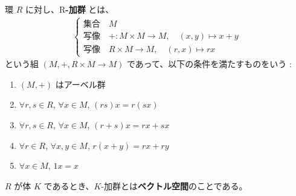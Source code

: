 \documentclass[article,paper=a4paper]{jlreq}
\begin{document}
\begin{dfn}
  環 $R$ に対し、R\textbf{-加群} とは、
  \begin{align*}
    \begin{cases}
      \text{集合} \quad M \\
      \text{写像} \quad + \colon M \times M \to M, \quad (x, y) \mapsto x + y \\
      \text{写像} \quad R \times M \to M, \quad (r, x) \mapsto rx
    \end{cases}
  \end{align*}
  という組 $(M, +, R \times M \to M)$ であって、以下の条件を満たすものをいう :
\begin{enumerate}
  \item $(M, +)$ はアーベル群
  \item $\forall r, s \in R$, $\forall x \in M$, $(rs)x = r(sx)$
  \item $\forall r, s \in R$, $\forall x \in M$, $(r + s)x = rx + sx$
  \item $\forall r \in R$, $\forall x, y \in M$, $r(x + y) = rx + ry$
  \item $\forall x \in M$, $1x = x$
\end{enumerate}
\end{dfn}

\begin{rem}
  $R$ が体 $K$ であるとき、$K$-加群とは\textbf{ベクトル空間}のことである。
\end{rem}

\clearpage
\end{document}
